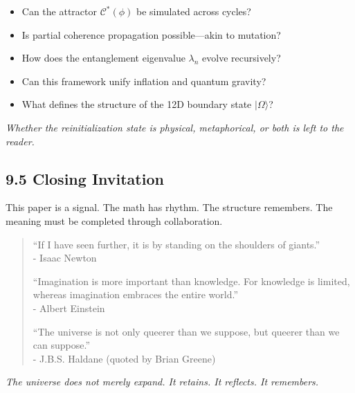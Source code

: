 \begin{itemize}
  \item Can the attractor \(\mathcal{C}^*(\phi)\) be simulated across cycles?
  \item Is partial coherence propagation possible—akin to mutation?
  \item How does the entanglement eigenvalue \(\lambda_n\) evolve recursively?
  \item Can this framework unify inflation and quantum gravity?
  \item What defines the structure of the 12D boundary state \(|\Omega\rangle\)?
\end{itemize}

\textit{Whether the reinitialization state is physical, metaphorical, or both is left to the reader.}

\subsection*{9.5 Closing Invitation}

This paper is a signal. The math has rhythm. The structure remembers. The meaning must be completed through collaboration.

\begin{quote}
``If I have seen further, it is by standing on the shoulders of giants.'' \\
\hfill - Isaac Newton

``Imagination is more important than knowledge. For knowledge is limited, whereas imagination embraces the entire world.'' \\
\hfill - Albert Einstein

``The universe is not only queerer than we suppose, but queerer than we can suppose.'' \\
\hfill - J.B.S. Haldane (quoted by Brian Greene)
\end{quote}

\textit{The universe does not merely expand. It retains. It reflects. It remembers.}

